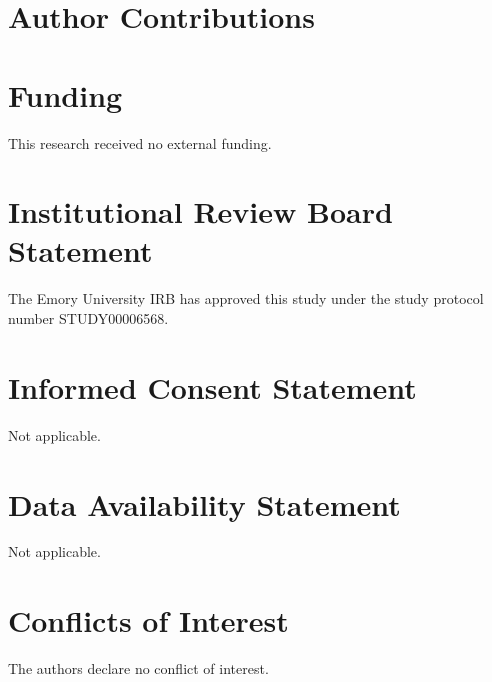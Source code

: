 \documentclass[journal,article,moreauthors]{Definitions/mdpi}
\begin{document}
\section*{Author Contributions}

\section*{Funding}
This research received no external funding. 

\section*{Institutional Review Board Statement}
The Emory University IRB has approved this study under the study protocol number STUDY00006568.

\section*{Informed Consent Statement}
Not applicable.

\section*{Data Availability Statement}
Not applicable.

\section*{Conflicts of Interest}
The authors declare no conflict of interest.


% 
% 
% 

\end{document}
